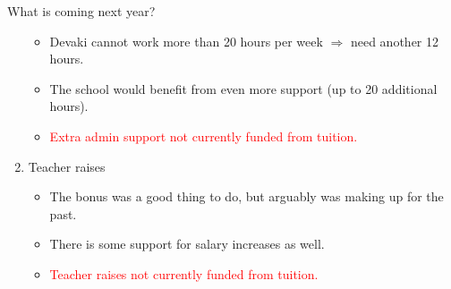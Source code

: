 \documentclass[8pt]{beamer}
\begin{document}
\begin{frame}{What is coming next year?}
\begin{enumerate}
\begin{itemize}
        \item Devaki cannot work more than 20 hours per week $\Rightarrow$ need another 12 hours.
        \item The school would benefit from even more support (up to 20 additional hours).
        \item \textcolor{red}{Extra admin support not currently funded from tuition.}
    \end{itemize}
%
\pause
\item Teacher raises
    \begin{itemize}
        \item The bonus was a good thing to do, but arguably was making up for the past.
        \item There is some support for salary increases as well.
        \item \textcolor{red}{Teacher raises not currently funded from tuition.}
    \end{itemize}
\end{enumerate}
%
\end{frame}
\end{document}
